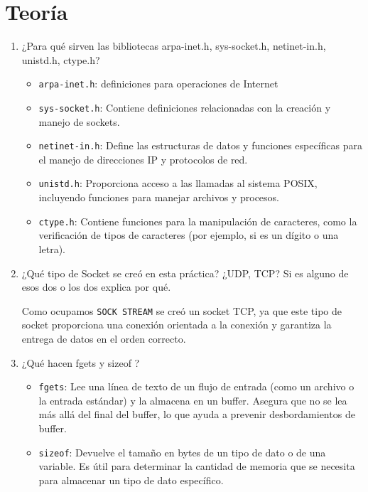 \documentclass{article}
\begin{document}
\section{Teoría}
\begin{enumerate}
    \item ¿Para qué sirven las bibliotecas arpa-inet.h, sys-socket.h, netinet-in.h, unistd.h, ctype.h?
    \begin{itemize}
        \item \texttt{arpa-inet.h}: definiciones para operaciones de Internet
        \item \texttt{sys-socket.h}: Contiene definiciones 
        relacionadas con la creación y manejo de sockets.
        \item \texttt{netinet-in.h}: Define las estructuras de datos y 
        funciones específicas para el manejo de direcciones IP y protocolos de red.
        \item \texttt{unistd.h}: Proporciona acceso a las llamadas al 
        sistema POSIX, incluyendo funciones para manejar archivos y procesos.
        \item \texttt{ctype.h}: Contiene funciones para la manipulación de 
        caracteres, como la verificación de tipos de caracteres (por ejemplo, si es 
        un dígito o una letra).
    \end{itemize}
    \item ¿Qué tipo de Socket se creó en esta práctica? ¿UDP, TCP? Si es alguno de esos dos o los dos
explica por qué.

Como ocupamos \texttt{SOCK STREAM} se creó un socket TCP, ya que este tipo de socket proporciona una conexión orientada a la conexión y garantiza la entrega de datos en el orden correcto.

\item ¿Qué hacen fgets y sizeof ?

\begin{itemize}
    \item \texttt{fgets}: Lee una línea de texto de un flujo de entrada (como un archivo o la entrada estándar) y la almacena en un buffer. Asegura que no se lea más allá del final del buffer, lo que ayuda a prevenir desbordamientos de buffer.
    \item \texttt{sizeof}: Devuelve el tamaño en bytes de un tipo de dato o de una variable. Es útil para determinar la cantidad de memoria que se necesita para almacenar un tipo de dato específico.
\end{itemize}


\end{enumerate}
\end{document}
